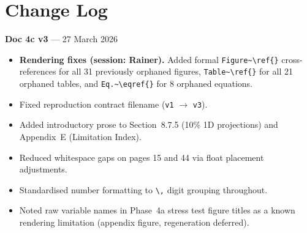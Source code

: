 \documentclass[11pt,a4paper]{article}
\begin{document}
\tableofcontents
\clearpage

\section*{Change Log}

\textbf{Doc 4c v3} --- 27 March 2026
\begin{itemize}
\item \textbf{Rendering fixes (session: Rainer).}  Added formal \texttt{Figure\textasciitilde\textbackslash ref\{\}} cross-references for all 31 previously orphaned figures, \texttt{Table\textasciitilde\textbackslash ref\{\}} for all 21 orphaned tables, and \texttt{Eq.\textasciitilde\textbackslash eqref\{\}} for 8 orphaned equations.
\item Fixed reproduction contract filename (\texttt{v1} $\to$ \texttt{v3}).
\item Added introductory prose to Section~8.7.5 (10\% 1D projections) and Appendix~E (Limitation Index).
\item Reduced whitespace gaps on pages 15 and 44 via float placement adjustments.
\item Standardised number formatting to \texttt{\textbackslash,} digit grouping throughout.
\item Noted raw variable names in Phase~4a stress test figure titles as a known rendering limitation (appendix figure, regeneration deferred).
\end{itemize}

\medskip
\end{document}
